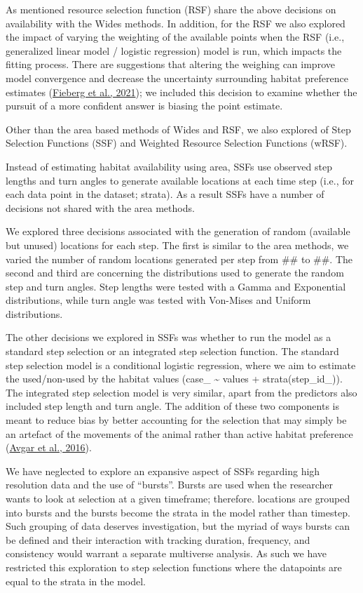 \documentclass[10pt,a4paper]{article}
\begin{document}
As mentioned resource selection function (RSF) share the above decisions on availability with the Wides methods.
In addition, for the RSF we also explored the impact of varying the weighting of the available points when the RSF (i.e., generalized linear model / logistic regression) model is run, which impacts the fitting process.
There are suggestions that altering the weighing can improve model convergence and decrease the uncertainty surrounding habitat preference estimates (\protect\hyperlink{ref-fieberg_how_2021}{Fieberg et al., 2021}); we included this decision to examine whether the pursuit of a more confident answer is biasing the point estimate.

Other than the area based methods of Wides and RSF, we also explored of Step Selection Functions (SSF) and Weighted Resource Selection Functions (wRSF).

Instead of estimating habitat availability using area, SSFs use observed step lengths and turn angles to generate available locations at each time step (i.e., for each data point in the dataset; strata).
As a result SSFs have a number of decisions not shared with the area methods.

We explored three decisions associated with the generation of random (available but unused) locations for each step.
The first is similar to the area methods, we varied the number of random locations generated per step from \#\# to \#\#.
The second and third are concerning the distributions used to generate the random step and turn angles.
Step lengths were tested with a Gamma and Exponential distributions, while turn angle was tested with Von-Mises and Uniform distributions.

The other decisions we explored in SSFs was whether to run the model as a standard step selection or an integrated step selection function.
The standard step selection model is a conditional logistic regression, where we aim to estimate the used/non-used by the habitat values (case\_ \textasciitilde{} values + strata(step\_id\_)).
The integrated step selection model is very similar, apart from the predictors also included step length and turn angle.
The addition of these two components is meant to reduce bias by better accounting for the selection that may simply be an artefact of the movements of the animal rather than active habitat preference (\protect\hyperlink{ref-avgar_integrated_2016}{Avgar et al., 2016}).

We have neglected to explore an expansive aspect of SSFs regarding high resolution data and the use of ``bursts''.
Bursts are used when the researcher wants to look at selection at a given timeframe; therefore. locations are grouped into bursts and the bursts become the strata in the model rather than timestep.
Such grouping of data deserves investigation, but the myriad of ways bursts can be defined and their interaction with tracking duration, frequency, and consistency would warrant a separate multiverse analysis.
As such we have restricted this exploration to step selection functions where the datapoints are equal to the strata in the model.
\end{document}
